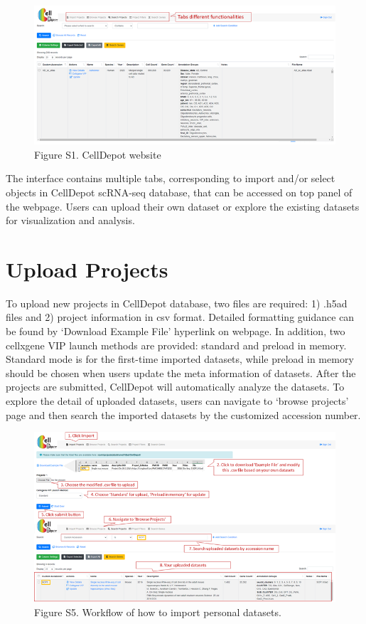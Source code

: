 \documentclass[
]{book}
\begin{document}
\begin{figure}
\centering
\includegraphics{figures/S4.png}
\caption{Figure S1. CellDepot website}
\end{figure}

The interface contains multiple tabs, corresponding to import and/or select objects in CellDepot scRNA-seq database, that can be accessed on top panel of the webpage. Users can upload their own dataset or explore the existing datasets for visualization and analysis.

\hypertarget{upload-projects}{%
\section{Upload Projects}\label{upload-projects}}

To upload new projects in CellDepot database, two files are required: 1) .h5ad files and 2) project information in csv format. Detailed formatting guidance can be found by `Download Example File' hyperlink on webpage. In addition, two cellxgene VIP launch methods are provided: standard and preload in memory. Standard mode is for the first-time imported datasets, while preload in memory should be chosen when users update the meta information of datasets.
After the projects are submitted, CellDepot will automatically analyze the datasets. To explore the detail of uploaded datasets, users can navigate to `browse projects' page and then search the imported datasets by the customized accession number.

\begin{figure}
\centering
\includegraphics{figures/S5.png}
\caption{Figure S5. Workflow of how to import personal datasets.}
\end{figure}
\end{document}

